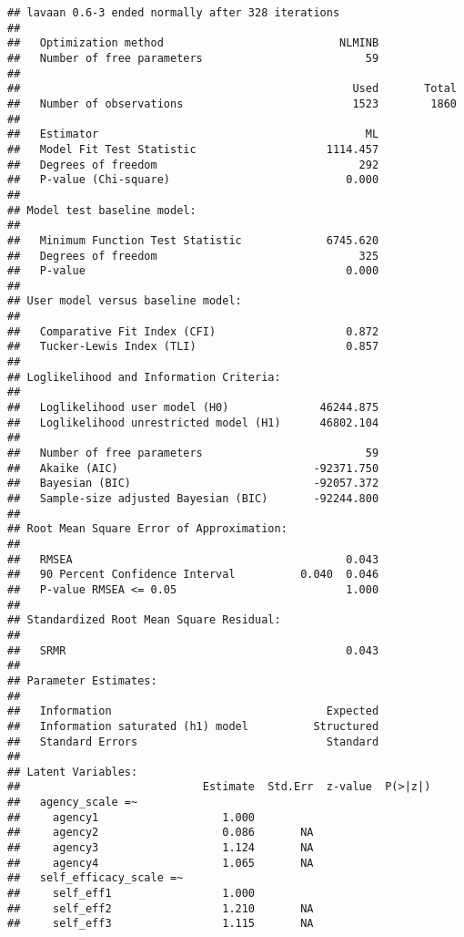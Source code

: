 \documentclass[9pt,]{article}
\begin{document}
\begin{verbatim}
## lavaan 0.6-3 ended normally after 328 iterations
## 
##   Optimization method                           NLMINB
##   Number of free parameters                         59
## 
##                                                   Used       Total
##   Number of observations                          1523        1860
## 
##   Estimator                                         ML
##   Model Fit Test Statistic                    1114.457
##   Degrees of freedom                               292
##   P-value (Chi-square)                           0.000
## 
## Model test baseline model:
## 
##   Minimum Function Test Statistic             6745.620
##   Degrees of freedom                               325
##   P-value                                        0.000
## 
## User model versus baseline model:
## 
##   Comparative Fit Index (CFI)                    0.872
##   Tucker-Lewis Index (TLI)                       0.857
## 
## Loglikelihood and Information Criteria:
## 
##   Loglikelihood user model (H0)              46244.875
##   Loglikelihood unrestricted model (H1)      46802.104
## 
##   Number of free parameters                         59
##   Akaike (AIC)                              -92371.750
##   Bayesian (BIC)                            -92057.372
##   Sample-size adjusted Bayesian (BIC)       -92244.800
## 
## Root Mean Square Error of Approximation:
## 
##   RMSEA                                          0.043
##   90 Percent Confidence Interval          0.040  0.046
##   P-value RMSEA <= 0.05                          1.000
## 
## Standardized Root Mean Square Residual:
## 
##   SRMR                                           0.043
## 
## Parameter Estimates:
## 
##   Information                                 Expected
##   Information saturated (h1) model          Structured
##   Standard Errors                             Standard
## 
## Latent Variables:
##                            Estimate  Std.Err  z-value  P(>|z|)
##   agency_scale =~                                             
##     agency1                   1.000                           
##     agency2                   0.086       NA                  
##     agency3                   1.124       NA                  
##     agency4                   1.065       NA                  
##   self_efficacy_scale =~                                      
##     self_eff1                 1.000                           
##     self_eff2                 1.210       NA                  
##     self_eff3                 1.115       NA                  

\end{verbatim}
\end{document}
